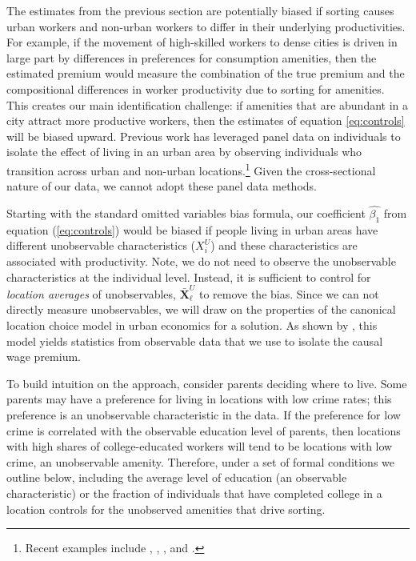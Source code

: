 \documentclass[12pt]{article}
\begin{document}
The estimates from the previous section are potentially biased if sorting causes urban workers and non-urban workers to differ in their underlying productivities.
For example, if the movement of high-skilled workers to dense cities is driven in large part by differences in preferences for consumption amenities, then the estimated premium would measure the combination of the true premium and the compositional differences in worker productivity due to sorting for amenities.
This creates our main identification challenge: if amenities that are abundant in a city attract more productive workers, then the estimates of equation \eqref{eq:controls} will be biased upward. 
Previous work has leveraged panel data on individuals to isolate the effect of living in an urban area by observing individuals who transition across urban and non-urban locations.\footnote{Recent examples include \citet{frings2022relative}, \citet{eckert2022return}, \citet{card2024location}, and \citet{adenbaum2025there}.} 
Given the cross-sectional nature of our data, we cannot adopt these panel data methods.

Starting with the standard omitted variables bias formula, our coefficient $\hat{\beta_1}$ from equation  (\ref{eq:controls}) would be biased if people living in urban areas have different unobservable characteristics ($X_{i}^{U}$) and these characteristics are associated with productivity.
Note, we do not need to observe the unobservable characteristics at the individual level.
Instead, it is sufficient to control for \emph{location averages} of unobservables, $\bar{\bm{X}}_\ell^U$ to remove the bias.
Since we can not directly measure unobservables, we will draw on the properties of the canonical location choice model in urban economics for a solution.
As shown by \citet{altonji2018estimating}, this model yields statistics from observable data that we use to isolate the causal wage premium. 

To build intuition on the approach, consider parents deciding where to live.
Some parents may have a preference for living in locations with low crime rates; this preference is an unobservable characteristic in the data.
If the preference for low crime is correlated with the observable education level of parents, then locations with high shares of college-educated workers will tend to be locations with low crime, an unobservable amenity.
Therefore, under a set of formal conditions we outline below, including the average level of education (an observable characteristic) or the fraction of individuals that have completed college in a location controls for the unobserved amenities that drive sorting.
\end{document}
